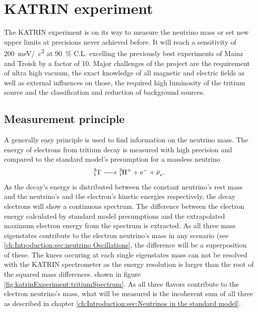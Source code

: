 %

    \chapter{KATRIN experiment}
    \label{ch:The KATRIN experiment}
    The KATRIN experiment is on its way to measure the neutrino mass or set new upper limits at precisions never achieved before. It will reach a sensitivity of \SI{200}{\milli\electronvolt}/\SI{}{\square c} at \SI{90}{\percent} C.L. excelling the previously best experiments of Mainz and Troisk by a factor of \SI{10}{}. Major challenges of the project are the requirement of ultra high vacuum, the exact knowledge of all magnetic and electric fields as well as external influences on those, the required high luminosity of the tritium source and the classification and reduction of background sources.
    
      \section{Measurement principle}
      \label{ch:The KATRIN experiment:sec:Measurement Principle}
      A generally easy principle is used to find information on the neutrino mass. The energy of electrons from tritium decay is measured with high precision and compared to the standard model's presumption for a massless neutrino \cite{}
      \begin{equation}
      	\ce{^3_1T -> ^3_1H^+ + e^- + \bar{\nu}_e}.
      \end{equation}
      As the decay's energy is distributed between the constant neutrino's rest mass and the neutrino's and the electron's kinetic energies respectively, the decay electrons will show a continuous spectrum. The difference between the electron energy calculated by standard model presumptions and the extrapolated maximum electron energy from the spectrum is extracted. As all three mass eigenstates contribute to the electron neutrino's mass in any scenario (see \ref{ch:Introduction:sec:neutrino Oscillations}, the difference will be a superposition of these. The knees occuring at each single eigenstates mass can not be resolved with the KATRIN spectrometer as the energy resolution is larger than the root of the squared mass differences.
      shown in figure \ref{fig:katrinExperiment:tritiumSpectrum}. As all three flavors contribute to the electron neutrino's mass, what will be measured is the incoherent sum of all three as described in chapter \ref{ch:Introduction:sec:Neutrinos in the standard model}.
      
